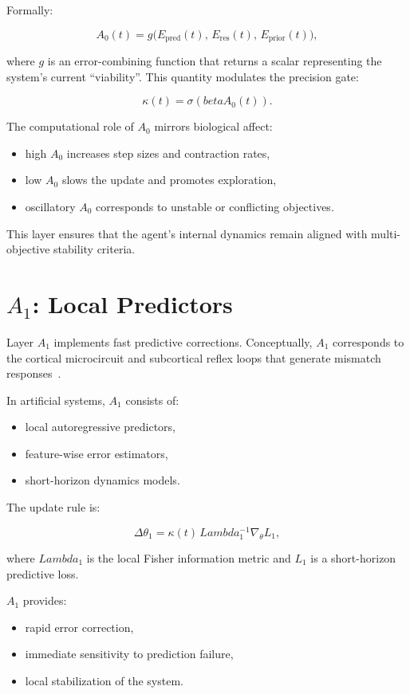 \documentclass[12pt,oneside]{book}
\theoremstyle{plain}
\theoremstyle{definition}
\let\citep\parencite
\def\beta{beta}%
\def\Lambda{Lambda}%
\begin{document}
Formally:

\[
A_0(t) = g\big(E_{\text{pred}}(t),\,E_{\text{res}}(t),\,E_{\text{prior}}(t)\big),
\]

where $g$ is an error-combining function that returns a scalar representing the
system’s current ``viability''.
This quantity modulates the precision gate:

\[
\kappa(t) = \sigma(\beta A_0(t)).
\]

The computational role of $A_0$ mirrors biological affect:

\begin{itemize}
    \item high $A_0$ increases step sizes and contraction rates,
    \item low $A_0$ slows the update and promotes exploration,
    \item oscillatory $A_0$ corresponds to unstable or conflicting objectives.
\end{itemize}

This layer ensures that the agent’s internal dynamics remain aligned with
multi-objective stability criteria.

\section{$A_1$: Local Predictors}

Layer $A_1$ implements fast predictive corrections.
Conceptually, $A_1$ corresponds to the cortical microcircuit and subcortical
reflex loops that generate mismatch responses~\citep{friston2010free}.

In artificial systems, $A_1$ consists of:

\begin{itemize}
    \item local autoregressive predictors,
    \item feature-wise error estimators,
    \item short-horizon dynamics models.
\end{itemize}

The update rule is:

\[
\Delta \theta_1 = \kappa(t) \, \Lambda_1^{-1} \nabla_\theta L_1,
\]

where $\Lambda_1$ is the local Fisher information metric and $L_1$ is a
short-horizon predictive loss.

$A_1$ provides:

\begin{itemize}
    \item rapid error correction,
    \item immediate sensitivity to prediction failure,
    \item local stabilization of the system.
\end{itemize}
\end{document}
